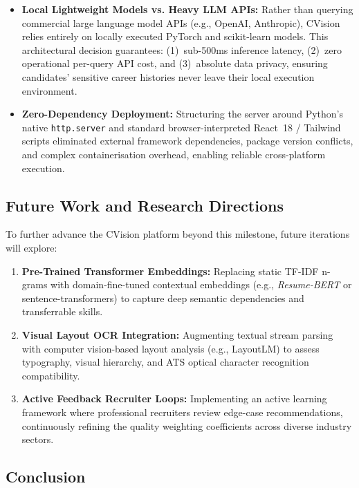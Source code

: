 \documentclass[11pt,a4paper]{article}
\begin{document}
\begin{itemize}
  \item \textbf{Local Lightweight Models vs. Heavy LLM APIs:} Rather than querying
  commercial large language model APIs (e.g., OpenAI, Anthropic), CVision relies
  entirely on locally executed PyTorch and scikit-learn models. This architectural
  decision guarantees: (1)~sub-500ms inference latency, (2)~zero operational per-query
  API cost, and (3)~absolute data privacy, ensuring candidates' sensitive career
  histories never leave their local execution environment.
  \item \textbf{Zero-Dependency Deployment:} Structuring the server around Python's
  native \texttt{http.server} and standard browser-interpreted React~18 / Tailwind
  scripts eliminated external framework dependencies, package version conflicts, and
  complex containerisation overhead, enabling reliable cross-platform execution.
\end{itemize}

\subsection{Future Work and Research Directions}
\label{sec:future_work}

To further advance the CVision platform beyond this milestone, future iterations will
explore:

\begin{enumerate}
  \item \textbf{Pre-Trained Transformer Embeddings:} Replacing static TF-IDF n-grams
  with domain-fine-tuned contextual embeddings (e.g., \emph{Resume-BERT} or
  sentence-transformers) to capture deep semantic dependencies and transferrable skills.
  \item \textbf{Visual Layout OCR Integration:} Augmenting textual stream parsing
  with computer vision-based layout analysis (e.g., LayoutLM) to assess typography,
  visual hierarchy, and ATS optical character recognition compatibility.
  \item \textbf{Active Feedback Recruiter Loops:} Implementing an active learning
  framework where professional recruiters review edge-case recommendations, continuously
  refining the quality weighting coefficients across diverse industry sectors.
\end{enumerate}

\subsection{Conclusion}
\label{sec:conclusion}
\end{document}
